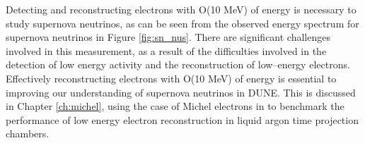 Detecting and reconstructing electrons with O(10 MeV) of energy is necessary 
to study supernova neutrinos, as can be seen from the observed energy spectrum 
for supernova neutrinos in Figure \ref{fig:sn_nus}. There are significant 
challenges involved in this measurement, as a result of the difficulties 
involved in the detection of low energy activity and the reconstruction of 
low--energy electrons. Effectively reconstructing electrons with O(10 MeV) of
energy is essential to improving our understanding of supernova neutrinos in 
DUNE. This is discussed in Chapter \ref{ch:michel}, using the case of Michel 
electrons in \protodune{} to benchmark the performance of low energy electron 
reconstruction in liquid argon time projection chambers.
